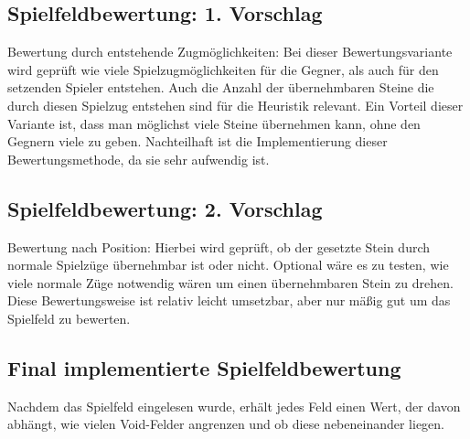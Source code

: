 \documentclass[12pt,a4paper]{article}
\begin{document}
\subsection{Spielfeldbewertung: 1. Vorschlag}
Bewertung durch entstehende Zugmöglichkeiten:\newline
Bei dieser Bewertungsvariante wird geprüft wie viele Spielzugmöglichkeiten für die Gegner, als auch für den setzenden Spieler entstehen. Auch die Anzahl der übernehmbaren Steine die durch diesen Spielzug entstehen sind für die Heuristik relevant. Ein Vorteil dieser Variante ist, dass man möglichst viele Steine übernehmen kann, ohne den Gegnern viele zu geben. Nachteilhaft ist die Implementierung dieser Bewertungsmethode, da sie sehr aufwendig ist.

\subsection{Spielfeldbewertung: 2. Vorschlag}
Bewertung nach Position: Hierbei wird geprüft, ob der gesetzte Stein durch normale Spielzüge übernehmbar ist oder nicht. Optional wäre es zu testen, wie viele normale Züge notwendig wären um einen übernehmbaren Stein zu drehen. Diese Bewertungsweise ist relativ leicht umsetzbar, aber nur mäßig gut um das Spielfeld zu bewerten.


\subsection{Final implementierte Spielfeldbewertung}
Nachdem das Spielfeld eingelesen wurde, erhält jedes Feld einen Wert, der davon abhängt, wie vielen Void-Felder angrenzen und ob diese nebeneinander liegen.
\end{document}
